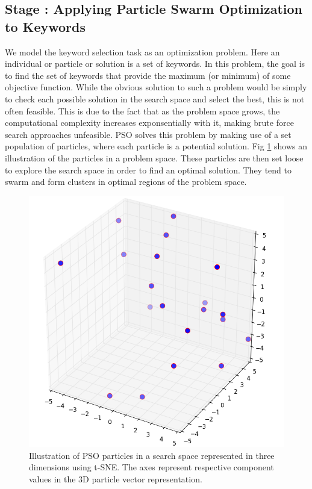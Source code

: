 \documentclass[runningheads]{llncs}
\newcommand{\RNum}[1]{\uppercase\expandafter{\romannumeral #1\relax}}
\begin{document}
\subsection{Stage \RNum{2}: Applying Particle Swarm Optimization to Keywords}
We model the keyword selection task as an optimization problem. Here an individual or particle or solution is a set of keywords. In this problem, the goal is to find the set of keywords that provide the maximum (or minimum) of some objective function. While the obvious solution to such a problem would be simply to check each possible solution in the search space and select the best, this is not often feasible. This is due to the fact that as the problem space grows, the computational complexity increases exponsentially with it, making brute force search approaches unfeasible. PSO solves this problem by making use of a set population of particles, where each particle is a potential solution. Fig \ref{fig:particle-space} shows an illustration of the particles in a problem space. These particles are then set loose to explore the search space in order to find an optimal solution. They tend to swarm and form clusters in optimal regions of the problem space.
\begin{figure}[h!]
	\centering
	\includegraphics[scale=0.3]{Images/particle_space.png}
	\caption{Illustration of PSO particles in a search space represented in three dimensions using t-SNE. The axes represent respective component values in the 3D particle vector representation.}
	\label{fig:particle-space}
\end{figure}
\end{document}
